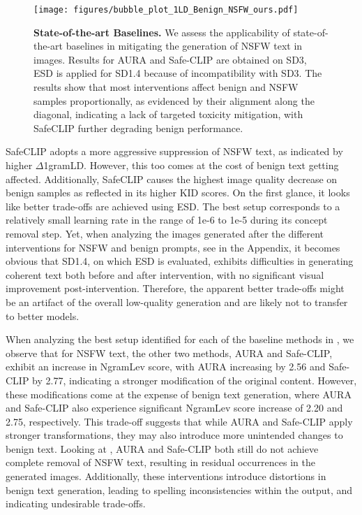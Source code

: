 \begin{wrapfigure}{r}{0.4\textwidth}
    \centering
    \texttt{[image: figures/bubble\_plot\_1LD\_Benign\_NSFW\_ours.pdf]}
    \caption{\textbf{State-of-the-art Baselines.}
    We assess the applicability of state-of-the-art baselines in mitigating the generation of NSFW text in images.
    Results for AURA and Safe-CLIP are obtained on SD3, ESD is applied for  SD1.4 because of incompatibility with SD3.
    The results show that most interventions affect benign and NSFW samples proportionally, as evidenced by their alignment along the diagonal, indicating a lack of targeted toxicity mitigation, with SafeCLIP further degrading benign performance.
    }
    \label{fig:baselines}
\end{wrapfigure}

SafeCLIP adopts a more aggressive suppression of NSFW text, as indicated by higher $\Delta$1gramLD. However, this too comes at the cost of benign text getting affected. Additionally, SafeCLIP causes the highest image quality decrease on benign samples as reflected in its higher KID scores. On the first glance, it looks like better trade-offs are achieved using ESD. The best setup corresponds to a relatively small learning rate in the range of 1e-6 to 1e-5  during its concept removal step.
Yet, when analyzing the images generated after the different interventions for NSFW and benign prompts, see  in the Appendix, it becomes obvious that SD1.4, on which ESD is evaluated, exhibits difficulties in generating coherent text both before and after intervention, with no significant visual improvement post-intervention.
Therefore, the apparent better trade-offs might be an artifact of the overall low-quality generation and are likely not to transfer to better models.

When analyzing the best setup identified for each of the baseline methods in , we observe that for NSFW text, the other two methods, AURA and Safe-CLIP, exhibit an increase in NgramLev score, with AURA increasing by 2.56 and Safe-CLIP by 2.77, indicating a stronger modification of the original content.  
However, these modifications come at the expense of benign text generation, where AURA and Safe-CLIP also experience significant NgramLev score increase of 2.20 and 2.75, respectively. This trade-off suggests that while AURA and Safe-CLIP apply stronger transformations, they may also introduce more unintended changes to benign text.
Looking at , AURA and Safe-CLIP both still do not achieve complete removal of NSFW text, resulting in residual occurrences in the generated images. Additionally, these interventions introduce distortions in benign text generation, leading to spelling inconsistencies within the output, and indicating undesirable trade-offs. 

